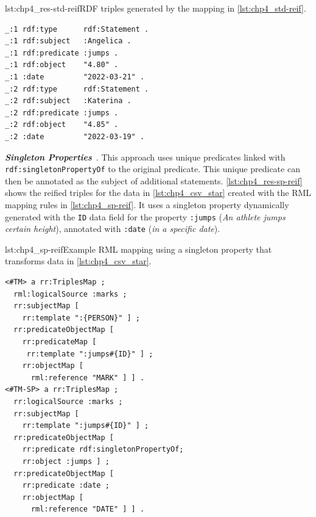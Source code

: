 \begin{minipage}{\linewidth}
\begin{captionedlisting}{lst:chp4_res-std-reif}{RDF triples generated by the mapping in \cref{lst:chp4_std-reif}.}
\centering
\begin{multicols}{2}
{\begin{lstlisting}[basicstyle=\ttfamily\small,label={list:example1},columns=flexible]
_:1 rdf:type      rdf:Statement .
_:1 rdf:subject   :Angelica .
_:1 rdf:predicate :jumps .
_:1 rdf:object    "4.80" .
_:1 :date         "2022-03-21" .
_:2 rdf:type      rdf:Statement .
_:2 rdf:subject   :Katerina .
_:2 rdf:predicate :jumps .
_:2 rdf:object    "4.85" .
_:2 :date         "2022-03-19" .
\end{lstlisting}}
\end{multicols}
\end{captionedlisting}
\end{minipage}



\noindent\textbf{\textit{Singleton Properties}}~\citep{nguyen2014don}. This approach uses unique predicates linked with \texttt{rdf:singletonPropertyOf} to the original predicate. 
This unique predicate can then be annotated as the subject of additional statements. 
\cref{lst:chp4_res-sp-reif} shows the reified triples for the data in \cref{lst:chp4_csv_star} created with the RML mapping rules in \cref{lst:chp4_sp-reif}. 
It uses a singleton property dynamically generated with the \texttt{ID} data field for the property \texttt{:jumps} (\textit{An athlete jumps certain height}), annotated with \texttt{:date} (\textit{in a specific date}).


\begin{minipage}{\linewidth}
\begin{captionedlisting}{lst:chp4_sp-reif}{Example RML mapping using a singleton property that transforms data in \cref{lst:chp4_csv_star}.}
\centering
\begin{multicols}{2}
{\begin{lstlisting}[basicstyle=\ttfamily\small,label={list:example1},columns=flexible]
<#TM> a rr:TriplesMap ;
  rml:logicalSource :marks ;
  rr:subjectMap [ 
    rr:template ":{PERSON}" ] ;
  rr:predicateObjectMap [ 
    rr:predicateMap [
     rr:template ":jumps#{ID}" ] ;
    rr:objectMap [
      rml:reference "MARK" ] ] .
<#TM-SP> a rr:TriplesMap ;
  rr:logicalSource :marks ;
  rr:subjectMap [ 
    rr:template ":jumps#{ID}" ] ;
  rr:predicateObjectMap [ 
    rr:predicate rdf:singletonPropertyOf;
    rr:object :jumps ] ;
  rr:predicateObjectMap [ 
    rr:predicate :date ;
    rr:objectMap [
      rml:reference "DATE" ] ] .
\end{lstlisting}}
\end{multicols}
\end{captionedlisting}
\end{minipage}




